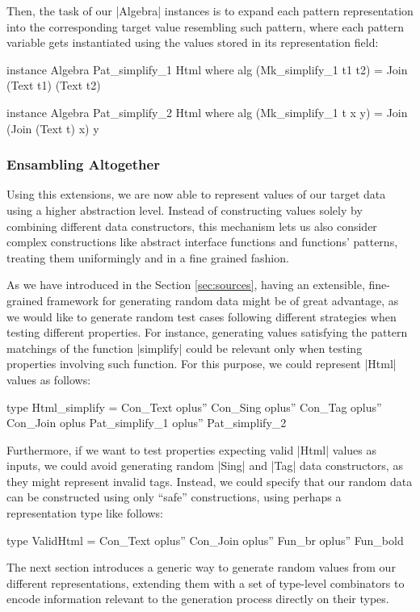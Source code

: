 Then, the task of our |Algebra| instances is to expand each pattern
representation into the corresponding target value resembling such pattern,
where each pattern variable gets instantiated using the values stored in its
representation field:

\begin{code}
instance Algebra Pat_simplify_1 Html where
  alg (Mk_simplify_1 t1 t2) = Join (Text t1) (Text t2)

instance Algebra Pat_simplify_2 Html where
  alg (Mk_simplify_1 t x y) = Join (Join (Text t) x) y
\end{code}


%
%
\subsubsection{Ensambling Altogether}

Using this extensions, we are now able to represent values of our target data
using a higher abstraction level.
%
Instead of constructing values solely by combining different data constructors,
this mechanism lets us also consider complex constructions like abstract
interface functions and functions' patterns, treating them uniformingly and in a
fine grained fashion.


As we have introduced in the Section \ref{sec:sources}, having an extensible,
fine-grained framework for generating random data might be of great advantage,
as we would like to generate random test cases following different strategies
when testing different properties.
%
For instance, generating values satisfying the pattern matchings of the function
|simplify| could be relevant only when testing properties involving such
function.
%
For this purpose, we could represent |Html| values as follows:
%
\begin{code}
type Html_simplify  =      Con_Text oplus'' Con_Sing oplus'' Con_Tag oplus'' Con_Join
                    oplus  Pat_simplify_1 oplus'' Pat_simplify_2
\end{code}



Furthermore, if we want to test properties expecting valid |Html| values as
inputs, we could avoid generating random |Sing| and |Tag| data constructors, as
they might represent invalid tags.
%
Instead, we could specify that our random data can be constructed using only
``safe'' constructions, using perhaps a representation type like follows:

\begin{code}
type ValidHtml = Con_Text oplus'' Con_Join oplus'' Fun_br oplus'' Fun_bold
\end{code}


The next section introduces a generic way to generate random values from our
different representations, extending them with a set of type-level combinators
to encode information relevant to the generation process directly on their
types.
